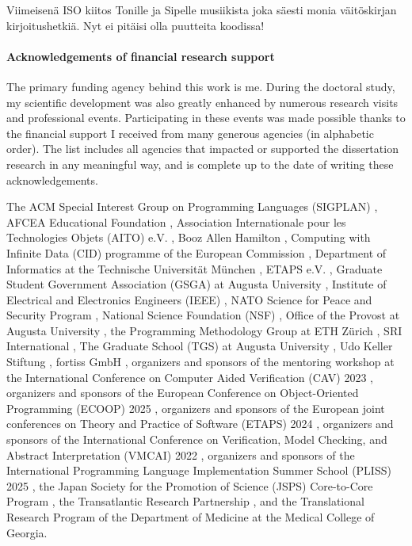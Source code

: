 Viimeisenä ISO kiitos Tonille ja Sipelle musiikista joka säesti monia väitöskirjan kirjoitushetkiä.
Nyt ei pitäisi olla puutteita koodissa!

\paragraph*{Acknowledgements of financial research support}
The primary funding agency behind this work is me.
During the doctoral study, my scientific development was also greatly enhanced by numerous research visits and professional events.
Participating in these events was made possible thanks to the financial support I received from many generous agencies (in alphabetic order).
The list includes all agencies that impacted or supported the dissertation research in any meaningful way, and is complete up to the date of writing these acknowledgements.

The ACM Special Interest Group on Programming Languages (SIGPLAN)%
, AFCEA Educational Foundation%
, Association Internationale pour les Technologies Objets (AITO) e.V.%
, Booz Allen Hamilton%
, Computing with Infinite Data (CID) programme of the European Commission%
, Department of Informatics at the Technische Universität München%
, ETAPS e.V.%
, Graduate Student Government Association (GSGA) at Augusta University%
, Institute of Electrical and Electronics Engineers (IEEE)%
, NATO Science for Peace and Security Program%
, National Science Foundation (NSF)%
, Office of the Provost at Augusta University%
, the Programming Methodology Group at ETH Zürich%
, SRI International%
, The Graduate School (TGS) at Augusta University%
, Udo Keller Stiftung%
, fortiss GmbH%
, organizers and sponsors of the mentoring workshop at the International Conference on Computer Aided Verification (CAV) 2023%
, organizers and sponsors of the European Conference on Object-Oriented Programming (ECOOP) 2025%
, organizers and sponsors of the European joint conferences on Theory and Practice of Software (ETAPS) 2024%
, organizers and sponsors of the International Conference on Verification, Model Checking, and Abstract Interpretation (VMCAI) 2022%
, organizers and sponsors of the International Programming Language Implementation Summer School (PLISS) 2025%
, the Japan Society for the Promotion of Science (JSPS) Core-to-Core Program%
, the Transatlantic Research Partnership%
, and the Translational Research Program of the Department of Medicine at the Medical College of Georgia.

